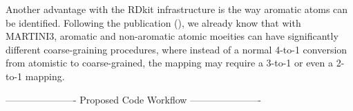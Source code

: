 Another advantage with the RDkit infrastructure is the way aromatic atoms can be identified. Following the publication (), we already know that with MARTINI3, aromatic and non-aromatic
atomic moeities can have significantly different coarse-graining procedures, where instead of a normal 4-to-1 conversion from atomistic to coarse-grained, the mapping may require a 3-to-1 or even
a 2-to-1 mapping.




----------------------
Proposed Code Workflow
----------------------



